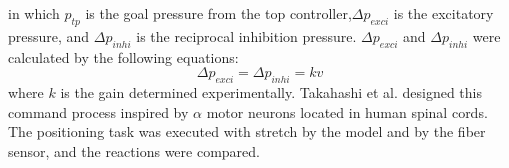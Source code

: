 in which $p_{tp}$ is the goal pressure from the top controller,$\Delta p_{exci}$ is the excitatory pressure, and $ \Delta p_{inhi}$ is the reciprocal inhibition pressure. 
$\Delta p_{exci}$ and $\Delta p_{inhi}$ were calculated by the following equations:
\begin{equation}
    \label{eq:reflex_pressure}
    \Delta p_{exci} =  \Delta p_{inhi} = kv
\end{equation}
where $k$ is the gain determined experimentally.
Takahashi et al. designed this command process inspired by $\alpha$ motor neurons located in human spinal cords\cite{takahashi}. The positioning task was executed with stretch by the model and by the fiber sensor, and the reactions were compared.
